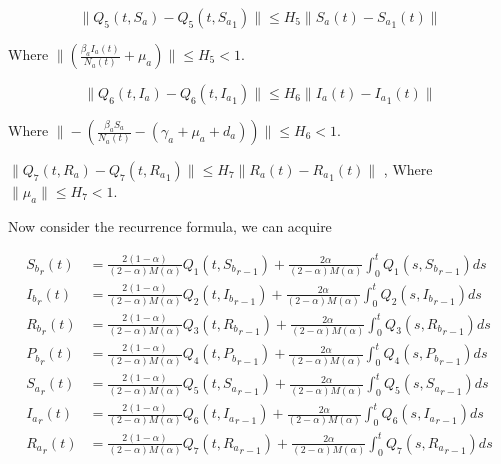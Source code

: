 \documentclass[10pt]{NSP1}
\begin{document}
\[
\| Q_{5}\left( t,S_{a} \right) - Q_{5}\left( t,{S_{a}}_{1} \right)\| \leq H_{5}\| S_{a}(t) - {S_{a}}_{1}(t)\|
\]

Where \(\|\left( \frac{\beta_{a}I_{a}(t)}{N_{a}(t)} + \mu_{a} \right)\| \leq H_{5} < 1\).

\[
\| Q_{6}\left( t,I_{a} \right) - Q_{6}\left( t,{I_{a}}_{1} \right)\| \leq H_{6}\| I_{a}(t) - {I_{a}}_{1}(t)\|
\]

Where \(\| - \left( \frac{\beta_{a}S_{a}}{N_{a}(t)} - \left( \gamma_{a} + \mu_{a} + d_{a} \right) \right)\| \leq H_{6} < 1\).

\(\| Q_{7}\left( t,R_{a} \right) - Q_{7}\left( t,{R_{a}}_{1} \right)\| \leq H_{7}\| R_{a}(t) - {R_{a}}_{1}(t)\|\) , Where \(\|\mu_{a}\| \leq H_{7} < 1.\)

Now consider the recurrence formula, we can acquire

\begin{equation}
\begin{aligned}
{S_{b}}_{r}(t) &= \frac{2(1 - \alpha)}{(2 - \alpha)M(\alpha)}Q_{1}\left( t,{S_{b}}_{r - 1} \right) + \frac{2\alpha}{(2 - \alpha)M(\alpha)}\int_{0}^{t}{}Q_{1}\left( s,{S_{b}}_{r - 1} \right)ds\ \\
{I_{b}}_{r}(t) &= \frac{2(1 - \alpha)}{(2 - \alpha)M(\alpha)}Q_{2}\left( t,{I_{b}}_{r - 1} \right) + \frac{2\alpha}{(2 - \alpha)M(\alpha)}\int_{0}^{t}{}Q_{2}\left( s,{I_{b}}_{r - 1} \right)ds\ \\
{R_{b}}_{r}(t) &= \frac{2(1 - \alpha)}{(2 - \alpha)M(\alpha)}Q_{3}\left( t,{R_{b}}_{r - 1} \right) + \frac{2\alpha}{(2 - \alpha)M(\alpha)}\int_{0}^{t}{}Q_{3}\left( s,{R_{b}}_{r - 1} \right)ds\ \\
{P_{b}}_{r}(t) &= \frac{2(1 - \alpha)}{(2 - \alpha)M(\alpha)}Q_{4}\left( t,{P_{b}}_{r - 1} \right) + \frac{2\alpha}{(2 - \alpha)M(\alpha)}\int_{0}^{t}{}Q_{4}\left( s,{P_{b}}_{r - 1} \right)ds\ \\
{S_{a}}_{r}(t) &= \frac{2(1 - \alpha)}{(2 - \alpha)M(\alpha)}Q_{5}\left( t,{S_{a}}_{r - 1} \right) + \frac{2\alpha}{(2 - \alpha)M(\alpha)}\int_{0}^{t}{}Q_{5}\left( s,{S_{a}}_{r - 1} \right)ds \\
{I_{a}}_{r}(t) &= \frac{2(1 - \alpha)}{(2 - \alpha)M(\alpha)}Q_{6}\left( t,{I_{a}}_{r - 1} \right) + \frac{2\alpha}{(2 - \alpha)M(\alpha)}\int_{0}^{t}{}Q_{6}\left( s,{I_{a}}_{r - 1} \right)ds \\
{R_{a}}_{r}(t) &= \frac{2(1 - \alpha)}{(2 - \alpha)M(\alpha)}Q_{7}\left( t,{R_{a}}_{r - 1} \right) + \frac{2\alpha}{(2 - \alpha)M(\alpha)}\int_{0}^{t}{}Q_{7}\left( s,{R_{a}}_{r - 1} \right)ds
\end{aligned}
\end{equation}
\end{document}
